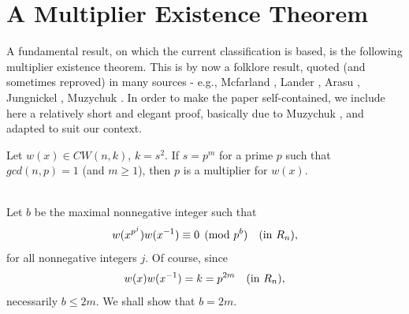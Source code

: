 {\begin{enumerate}
\end{enumerate}



\section{A Multiplier Existence Theorem} \label{mul_sec}

A fundamental result, on which the current classification is based, is the following 
multiplier existence theorem. This is by now a folklore result, quoted 
(and sometimes reproved) in many sources - e.g., Mcfarland \cite{mcf80}, 
Lander \cite{lan83}, Arasu \cite{as98}, Jungnickel \cite{jun92}, 
Muzychuk \cite{muz97}.
In order to make the paper self-contained, we include here a relatively short 
and elegant proof, basically due to Muzychuk \cite{muz97}, and adapted to 
suit our context. 

\begin{thm}  
	 Let $w(x) \in CW(n,k)$, $k=s^2$. If $s=p^m$ for a prime $p$  
	 such that 
	 $gcd(n,p)=1$ (and $m \geq 1$), then $p$ is a multiplier for $w(x)$.
\end{thm}
\begin{pr}
{\normalsize { \ }\\
  Let $b$ be the maximal nonnegative integer such that       
	$$ w(x^{p^j})w(x^{-1}) \equiv 0 \pmod{p^b} \quad ({\rm in} \ R_n),$$ 
  for all nonnegative integers $j$. Of course, since 
	$$ w(x)w(x^{-1})=k=p^{2m}  \quad ({\rm in} \ R_n),$$ 
  necessarily $b \leq 2m$. We shall show that $b=2m$. 

}
\end{pr}}
